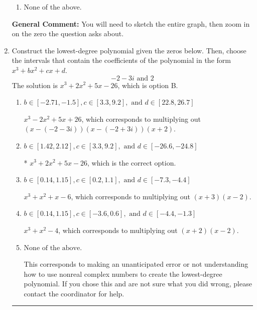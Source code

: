 \documentclass{extbook}[14pt]
\newcommand{\litem}[1]{\item #1

\rule{\textwidth}{0.4pt}}
\begin{document}
\begin{enumerate}
{\begin{enumerate}[label=\Alph*.]
\item None of the above.\end{enumerate}
\textbf{General Comment:} You will need to sketch the entire graph, then zoom in on the zero the question asks about.
}
\litem{
Construct the lowest-degree polynomial given the zeros below. Then, choose the intervals that contain the coefficients of the polynomial in the form $x^3+bx^2+cx+d$.
\[ -2 - 3 i \text{ and } 2 \]The solution is \( x^{3} +2 x^{2} +5 x -26 \), which is option B.\begin{enumerate}[label=\Alph*.]
\item \( b \in [-2.71, -1.5], c \in [3.3, 9.2], \text{ and } d \in [22.8, 26.7] \)

$x^{3} -2 x^{2} +5 x + 26$, which corresponds to multiplying out $(x-(-2 - 3 i))(x-(-2 + 3 i))(x + 2)$.
\item \( b \in [1.42, 2.12], c \in [3.3, 9.2], \text{ and } d \in [-26.6, -24.8] \)

* $x^{3} +2 x^{2} +5 x -26$, which is the correct option.
\item \( b \in [0.14, 1.15], c \in [0.2, 1.1], \text{ and } d \in [-7.3, -4.4] \)

$x^{3} + x^{2} +x -6$, which corresponds to multiplying out $(x + 3)(x -2)$.
\item \( b \in [0.14, 1.15], c \in [-3.6, 0.6], \text{ and } d \in [-4.4, -1.3] \)

$x^{3} + x^{2} -4$, which corresponds to multiplying out $(x + 2)(x -2)$.
\item \( \text{None of the above.} \)

This corresponds to making an unanticipated error or not understanding how to use nonreal complex numbers to create the lowest-degree polynomial. If you chose this and are not sure what you did wrong, please contact the coordinator for help.
\end{enumerate}

}
\end{enumerate}
\end{document}

